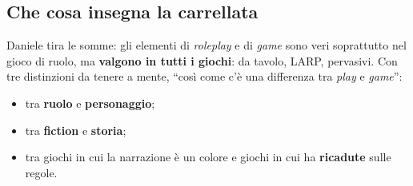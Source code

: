\subsection{Che cosa insegna la carrellata}

Daniele tira le somme: gli elementi di \emph{roleplay} e di \emph{game} sono veri soprattutto
nel gioco di ruolo, ma \textbf{valgono in tutti i giochi}: da tavolo, LARP, pervasivi. Con tre
distinzioni da tenere a mente, ``così come c'è una differenza tra \emph{play} e \emph{game}'':
\begin{itemize}
  \item tra \textbf{ruolo} e \textbf{personaggio};
  \item tra \textbf{fiction} e \textbf{storia};
  \item tra giochi in cui la narrazione è un colore e giochi in cui ha \textbf{ricadute} sulle
        regole.
\end{itemize}

